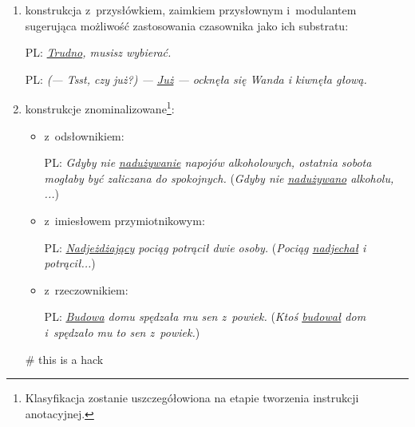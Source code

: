 \documentclass{udisc}
\begin{document}
\begin{enumerate}
            \begin{ex}
            PL: \textit{(Niech pan tam nawet nie idzie), aż \uline{strach} patrzeć.}
            \end{ex}

\item konstrukcja z~przysłówkiem, zaimkiem przysłownym i~modulantem
      sugerująca możliwość zastosowania czasownika jako ich substratu:

            \begin{ex}
            PL: \textit{\uline{Trudno}, musisz wybierać.}
            \end{ex}

            \begin{ex}
            PL: \textit{(— Tsst, czy już?) — \uline{Już} — ocknęła się Wanda i kiwnęła głową.}
            \end{ex}

\item konstrukcje znominalizowane\footnote{Klasyfikacja zostanie uszczegółowiona na etapie tworzenia instrukcji anotacyjnej.}:

      \begin{itemize}

      \item z~odsłownikiem:

            \begin{ex}
            PL: \textit{Gdyby nie \uline{nadużywanie} napojów alkoholowych, ostatnia sobota mogłaby być zaliczana do spokojnych.} (\textit{Gdyby nie \uline{nadużywano} alkoholu, ...})
            \end{ex}

      \item z~imiesłowem przymiotnikowym:

            \begin{ex}
            PL: \textit{\uline{Nadjeżdżający} pociąg potrącił dwie osoby.} (\textit{Pociąg \uline{nadjechał} i potrącił...})
            \end{ex}

      \item z~rzeczownikiem:

            \begin{ex}
            PL: \textit{\uline{Budowa} domu spędzała mu sen z~powiek.} (\textit{Ktoś \uline{budował} dom i~spędzało mu to sen z~powiek.})\\
            \end{ex}

      \end{itemize}

\nonstopmode %
\nonstopmode # this is a hack
\end{enumerate}
\errorstopmode
\errorstopmode
\end{document}
